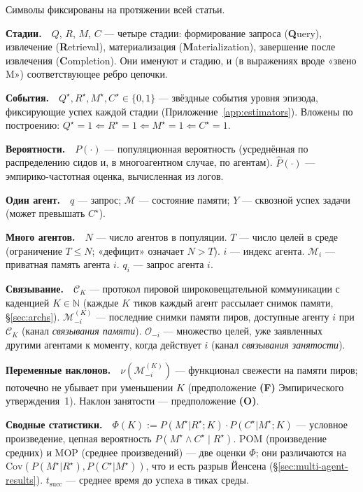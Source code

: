 \documentclass{article}
\begin{document}
Символы фиксированы на протяжении всей статьи.

\newcommand{\notentry}[1]{\par\smallskip\noindent\textbf{#1}\ \ }

\notentry{Стадии.}$Q$, $R$, $M$, $C$ --- четыре стадии: формирование запроса (\textbf{Q}uery), извлечение (\textbf{R}etrieval), материализация (\textbf{M}aterialization), завершение после извлечения (\textbf{C}ompletion). Они именуют и стадию, и (в выражениях вроде «звено M») соответствующее ребро цепочки.

\notentry{События.}$Q^\star, R^\star, M^\star, C^\star \in \{0, 1\}$ --- звёздные события уровня эпизода, фиксирующие успех каждой стадии (Приложение~\ref{app:estimators}). Вложены по построению: $Q^\star{=}1 \Leftarrow R^\star{=}1 \Leftarrow M^\star{=}1 \Leftarrow C^\star{=}1$.

\notentry{Вероятности.}$P(\cdot)$ --- популяционная вероятность (усреднённая по распределению сидов и, в многоагентном случае, по агентам). $\hat{P}(\cdot)$ --- эмпирико-частотная оценка, вычисленная из логов.

\notentry{Один агент.}$q$ --- запрос; $\mathcal{M}$ --- состояние памяти; $Y$ --- сквозной успех задачи (может превышать $C^\star$).

\notentry{Много агентов.}$N$ --- число агентов в популяции. $T$ --- число целей в среде (ограничение $T \le N$; «дефицит» означает $N > T$). $i$ --- индекс агента. $\mathcal{M}_i$ --- приватная память агента $i$. $q_i$ --- запрос агента $i$.

\notentry{Связывание.}$\mathcal{C}_K$ --- протокол пировой широковещательной коммуникации с каденцией $K \in \mathbb{N}$ (каждые $K$ тиков каждый агент рассылает снимок памяти, \S\ref{sec:archs}). $\mathcal{M}_{-i}^{(K)}$ --- последние снимки памяти пиров, доступные агенту $i$ при $\mathcal{C}_K$ (канал \emph{связывания памяти}). $\mathcal{O}_{-i}$ --- множество целей, уже заявленных другими агентами к моменту, когда действует $i$ (канал \emph{связывания занятости}).

\notentry{Переменные наклонов.}$\nu(\mathcal{M}_{-i}^{(K)})$ --- функционал свежести на памяти пиров; поточечно не убывает при уменьшении $K$ (предположение \textbf{(F)} Эмпирического утверждения~1). Наклон занятости --- предположение \textbf{(O)}.

\notentry{Сводные статистики.}$\Phi(K) := P(M^\star|R^\star;K)\cdot P(C^\star|M^\star;K)$ --- условное произведение, цепная вероятность $P(M^\star \land C^\star \mid R^\star)$. POM (произведение средних) и MOP (среднее произведений) --- две оценки $\Phi$; они различаются на $\mathrm{Cov}(P(M^\star|R^\star), P(C^\star|M^\star))$, что и есть разрыв Йенсена (\S\ref{sec:multi-agent-results}). $t_{\mathrm{succ}}$ --- среднее время до успеха в тиках среды.
\par\smallskip
\end{document}
